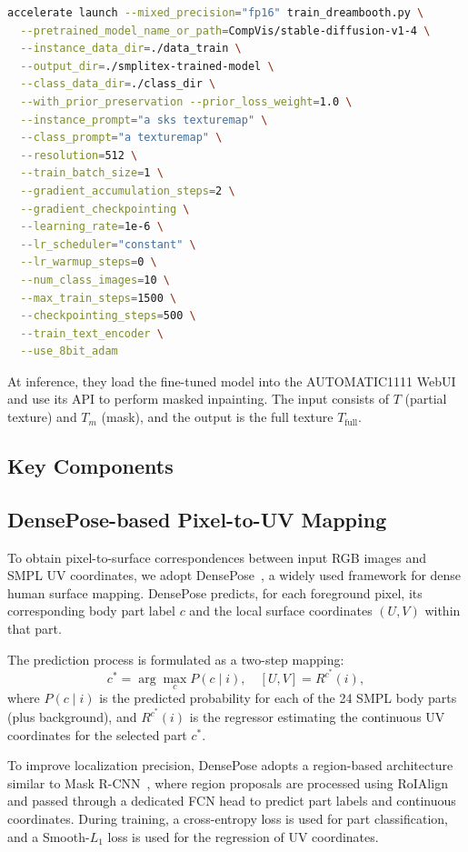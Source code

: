 \begin{lstlisting}[language=bash]
accelerate launch --mixed_precision="fp16" train_dreambooth.py \
  --pretrained_model_name_or_path=CompVis/stable-diffusion-v1-4 \
  --instance_data_dir=./data_train \
  --output_dir=./smplitex-trained-model \
  --class_data_dir=./class_dir \
  --with_prior_preservation --prior_loss_weight=1.0 \
  --instance_prompt="a sks texturemap" \
  --class_prompt="a texturemap" \
  --resolution=512 \
  --train_batch_size=1 \
  --gradient_accumulation_steps=2 \
  --gradient_checkpointing \
  --learning_rate=1e-6 \
  --lr_scheduler="constant" \
  --lr_warmup_steps=0 \
  --num_class_images=10 \
  --max_train_steps=1500 \
  --checkpointing_steps=500 \
  --train_text_encoder \
  --use_8bit_adam
\end{lstlisting}

At inference, they load the fine-tuned model into the AUTOMATIC1111 WebUI~\cite{automatic1111webui} and use its API to perform masked inpainting. The input consists of $T$ (partial texture) and $T_m$ (mask), and the output is the full texture $T_{\text{full}}$.

\subsection{Key Components}
\subsection{DensePose-based Pixel-to-UV Mapping}
\label{sec:densepose}

To obtain pixel-to-surface correspondences between input RGB images and SMPL UV coordinates, we adopt DensePose~\cite{wu2019detectron2}, a widely used framework for dense human surface mapping. DensePose predicts, for each foreground pixel, its corresponding body part label $c$ and the local surface coordinates $(U, V)$ within that part.

The prediction process is formulated as a two-step mapping:
\begin{equation}
    c^{*} = \arg\max_{c} P(c \mid i), \quad [U, V] = R^{c^*}(i),
\end{equation}
where $P(c \mid i)$ is the predicted probability for each of the 24 SMPL body parts (plus background), and $R^{c^*}(i)$ is the regressor estimating the continuous UV coordinates for the selected part $c^*$.

To improve localization precision, DensePose adopts a region-based architecture similar to Mask R-CNN~\cite{matterport_maskrcnn_2017}, where region proposals are processed using RoIAlign~\cite{gong2021temporalroialignvideo} and passed through a dedicated FCN head to predict part labels and continuous coordinates. During training, a cross-entropy loss is used for part classification, and a Smooth-$L_1$ loss is used for the regression of UV coordinates.

